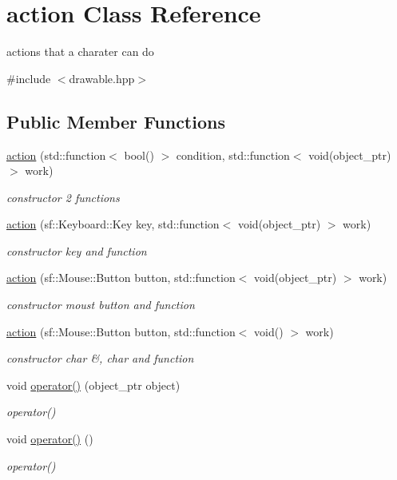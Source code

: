 \hypertarget{classaction}{}\section{action Class Reference}
\label{classaction}


actions that a charater can do  




{\ttfamily \#include $<$drawable.\+hpp$>$}

\subsection*{Public Member Functions}
\begin{DoxyCompactItemize}
\item 
\hyperlink{classaction_a481b1b2e3892600143fd7b2db4ac5729}{action} (std\+::function$<$ bool() $>$ condition, std\+::function$<$ void(object\+\_\+ptr) $>$ work)
\begin{DoxyCompactList}\small\item\em constructor 2 functions \end{DoxyCompactList}\item 
\hyperlink{classaction_a504531cbc56e9c4a60b4e5d40bc018a6}{action} (sf\+::\+Keyboard\+::\+Key key, std\+::function$<$ void(object\+\_\+ptr) $>$ work)
\begin{DoxyCompactList}\small\item\em constructor key and function \end{DoxyCompactList}\item 
\hyperlink{classaction_abf43e8dfaeca2df9d356fbfd4d1790ba}{action} (sf\+::\+Mouse\+::\+Button button, std\+::function$<$ void(object\+\_\+ptr) $>$ work)
\begin{DoxyCompactList}\small\item\em constructor moust button and function \end{DoxyCompactList}\item 
\hyperlink{classaction_a55a91caa9803002fa7ddd6e9e9e46dc6}{action} (sf\+::\+Mouse\+::\+Button button, std\+::function$<$ void() $>$ work)
\begin{DoxyCompactList}\small\item\em constructor char \&, char and function \end{DoxyCompactList}\item 
void \hyperlink{classaction_ab4f8d0f7552450455977d09a889c18c7}{operator()} (object\+\_\+ptr object)
\begin{DoxyCompactList}\small\item\em operator() \end{DoxyCompactList}\item 
void \hyperlink{classaction_a92c003677656b5b3e6e58b19376e6b04}{operator()} ()
\begin{DoxyCompactList}\small\item\em operator() \end{DoxyCompactList}\end{DoxyCompactItemize}


